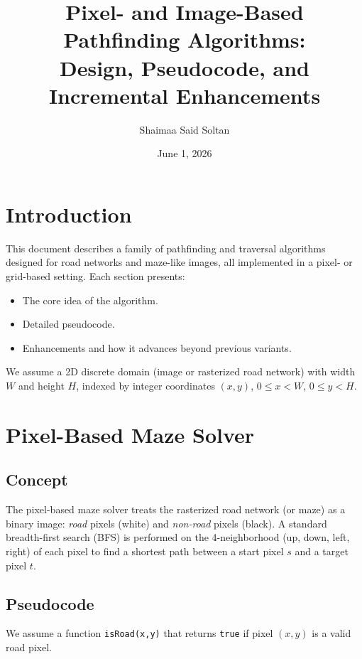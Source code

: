 \documentclass[11pt]{article}
\title{Pixel- and Image-Based Pathfinding Algorithms:\\
Design, Pseudocode, and Incremental Enhancements}
\author{Shaimaa Said Soltan}
\date{June 1, 2026}
\begin{document}
\maketitle

\tableofcontents

\section{Introduction}

This document describes a family of pathfinding and traversal algorithms
designed for road networks and maze-like images, all implemented in a
pixel- or grid-based setting. Each section presents:
\begin{itemize}
  \item The core idea of the algorithm.
  \item Detailed pseudocode.
  \item Enhancements and how it advances beyond previous variants.
\end{itemize}

We assume a 2D discrete domain (image or rasterized road network) with
width $W$ and height $H$, indexed by integer coordinates
$(x,y)$, $0 \le x < W$, $0 \le y < H$.

\section{Pixel-Based Maze Solver}
\label{sec:pixel_maze}

\subsection{Concept}

The pixel-based maze solver treats the rasterized road network (or maze)
as a binary image: \emph{road} pixels (white) and \emph{non-road} pixels
(black). A standard breadth-first search (BFS) is performed on the
4-neighborhood (up, down, left, right) of each pixel to find a shortest
path between a start pixel $s$ and a target pixel $t$.

\subsection{Pseudocode}

We assume a function \texttt{isRoad(x,y)} that returns \texttt{true} if
pixel $(x,y)$ is a valid road pixel.
\end{document}
